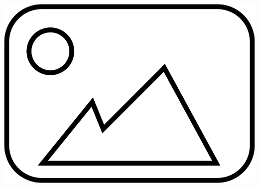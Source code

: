 \documentclass[aspectratio=169,10pt]{beamer}
\begin{document}
\begin{frame}
\begin{columns}[T]
\begin{column}{0.5\textwidth}
            \centering
            \includegraphics[width=\textwidth]{placeholder.png} %
            
        \end{column}
    \end{columns}
\end{frame}
\end{document}
